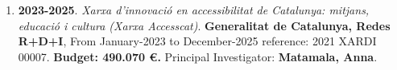 \begin{enumerate}
\item {\bf 2023-2025}. {\it Xarxa d'innovació en accessibilitat de Catalunya: mitjans, educació i cultura (Xarxa Accesscat)}. {\bf Generalitat de Catalunya, Redes R+D+I}, From January-2023 to December-2025 reference: 2021 XARDI 00007. {\bf  Budget: 490.070 €.} Principal Investigator: {\bf Matamala, Anna}.\filbreak
\end{enumerate} 
